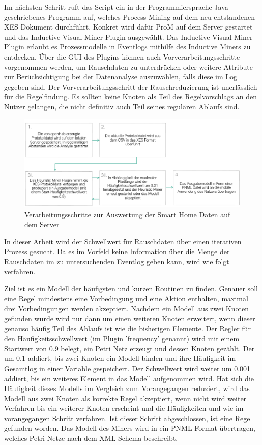 Im nächsten Schritt ruft das Script ein in der Programmiersprache Java geschriebenes Programm auf, welches Process Mining auf dem neu entstandenen XES Dokument durchführt. Konkret wird dafür ProM auf dem Server gestartet und das Inductive Visual Miner Plugin ausgewählt.
Das Inductive Visual Miner Plugin erlaubt es Prozessmodelle in Eventlogs mithilfe des Inductive Miners zu entdecken. Über die GUI des Plugins können auch Vorverarbeitungsschritte vorgenommen werden, um Rauschdaten zu unterdrücken oder weitere Attribute zur Berücksichtigung bei der Datenanalyse auszuwählen, falls diese im Log gegeben sind. Der Vorverarbeitungsschritt der Rauschreduzierung ist unerlässlich für die Regelfindung. Es sollten keine Knoten als Teil des Regelvorschlags an den Nutzer gelangen, die nicht definitiv auch Teil seines regulären Ablaufs sind. 

\begin{figure}[!h]
    \centering
    \includegraphics[width=\textwidth,origin=c]{figures/Appbildungen/ServerSchritte.PNG}
    \caption{Verarbeitungsschritte zur Auswertung der Smart Home Daten auf dem Server}
    \label{fig:4}
\end{figure}

In dieser Arbeit wird der Schwellwert für Rauschdaten über einen iterativen Prozess gesucht. Da es im Vorfeld keine Information über die Menge der Rauschdaten im zu untersuchenden Eventlog geben kann, wird wie folgt verfahren. 

Ziel ist es ein Modell der häufigsten und kurzen Routinen zu finden. Genauer soll eine Regel mindestens eine Vorbedingung und eine Aktion enthalten, maximal drei Vorbedingungen werden akzeptiert. Nachdem ein Modell aus zwei Knoten gefunden wurde wird nur dann um einen weiteren Knoten erweitert, wenn dieser genauso häufig Teil des Ablaufs ist wie die bisherigen Elemente. Der Regler für den Häufigkeitsschwellwert (im Plugin 'frequency' genannt) wird mit einem Startwert von 0.9 belegt, ein Petri Netz erzeugt und dessen Knoten gezählt. Der um 0.1 addiert, bis zwei Knoten ein Modell binden und ihre Häufigkeit im Gesamtlog in einer Variable gespeichert. Der Schwellwert wird weiter um 0.001 addiert, bis ein weiteres Element in das Modell aufgenommen wird. Hat sich die Häufigkeit dieses Modells im Vergleich zum Vorangegangen reduziert, wird das Modell aus zwei Knoten als korrekte Regel akzeptiert, wenn nicht wird weiter Verfahren bis ein weiterer Knoten erscheint und die Häufigkeiten und wie im vorangegangen Schritt verfahren.
Ist dieser Schritt abgeschlossen, ist eine Regel gefunden worden.
Das Modell des Miners wird in ein PNML Format übertragen, welches Petri Netze nach dem XML Schema beschreibt.

